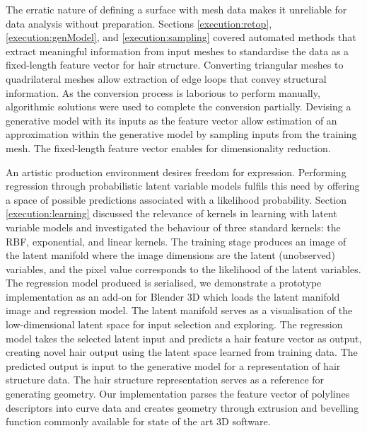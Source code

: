 \documentclass[ %
author={Dillon Keith Diep},
supervisor={Dr. Carl Henrik Ek},
degree={MEng},
title={ART-CG Hair:},
subtitle={Assisted Real-time Content Generation of Stylised Virtual Hair},
type={Research},
year={2017} ]{dissertation}
\begin{document}
The erratic nature of defining a surface with mesh data makes it unreliable for data analysis without preparation.
Sections \ref{execution:retop}, \ref{execution:genModel}, and \ref{execution:sampling} covered automated methods that extract meaningful information from input meshes to standardise the data as a fixed-length feature vector for hair structure.
Converting triangular meshes to quadrilateral meshes allow extraction of edge loops that convey structural information. As the conversion process is laborious to perform manually, algorithmic solutions were used to complete the conversion partially.
Devising a generative model with its inputs as the feature vector allow estimation of an approximation within the generative model by sampling inputs from the training mesh.
The fixed-length feature vector enables for dimensionality reduction.

An artistic production environment desires freedom for expression. Performing regression through probabilistic latent variable models fulfils this need by offering a space of possible predictions associated with a likelihood probability.
Section \ref{execution:learning} discussed the relevance of kernels in learning with latent variable models and investigated the behaviour of three standard kernels: the RBF, exponential, and linear kernels.
The training stage produces an image of the latent manifold where the image dimensions are the latent (unobserved) variables, and the pixel value corresponds to the likelihood of the latent variables.
The regression model produced is serialised, we demonstrate a prototype implementation as an add-on for Blender 3D which loads the latent manifold image and regression model. The latent manifold serves as a visualisation of the low-dimensional latent space for input selection and exploring. The regression model takes the selected latent input and predicts a hair feature vector as output, creating novel hair output using the latent space learned from training data.
The predicted output is input to the generative model for a representation of hair structure data. 
The hair structure representation serves as a reference for generating geometry.
Our implementation parses the feature vector of polylines descriptors into curve data and creates geometry through extrusion and bevelling function commonly available for state of the art 3D software.
\end{document}
